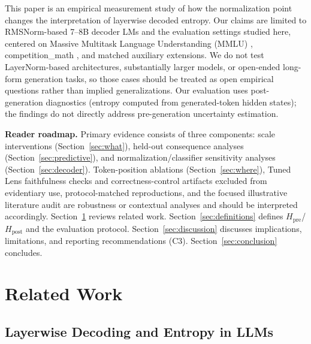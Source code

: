 \documentclass{ieeeaccess}
\newcommand{\Hpre}{H_{\text{pre}}}
\newcommand{\Hpost}{H_{\text{post}}}
\begin{document}
This paper is an empirical measurement study of how the normalization point changes the interpretation of layerwise decoded entropy. Our claims are limited to RMSNorm-based 7--8B decoder LMs and the evaluation settings studied here, centered on Massive Multitask Language Understanding (MMLU) \cite{hendrycks2021mmlu}, competition\_math \cite{hendrycks2021math}, and matched auxiliary extensions. We do not test LayerNorm-based architectures, substantially larger models, or open-ended long-form generation tasks, so those cases should be treated as open empirical questions rather than implied generalizations. Our evaluation uses post-generation diagnostics (entropy computed from generated-token hidden states); the findings do not directly address pre-generation uncertainty estimation.

\textbf{Reader roadmap.} Primary evidence consists of three components: scale interventions (Section~\ref{sec:what}), held-out consequence analyses (Section~\ref{sec:predictive}), and normalization/classifier sensitivity analyses (Section~\ref{sec:decoder}). Token-position ablations (Section~\ref{sec:where}), Tuned Lens faithfulness checks and correctness-control artifacts excluded from evidentiary use, protocol-matched reproductions, and the focused illustrative literature audit are robustness or contextual analyses and should be interpreted accordingly. Section~\ref{sec:related} reviews related work. Section~\ref{sec:definitions} defines $\Hpre$/$\Hpost$ and the evaluation protocol. Section~\ref{sec:discussion} discusses implications, limitations, and reporting recommendations (C3). Section~\ref{sec:conclusion} concludes.


\section{Related Work}
\label{sec:related}

\subsection{Layerwise Decoding and Entropy in LLMs}
\end{document}
